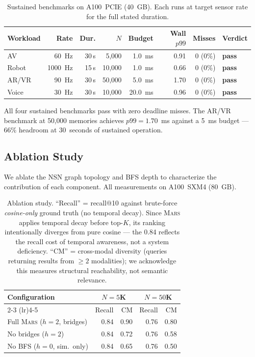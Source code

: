 \documentclass[11pt]{article}
\newcommand{\mars}{\textsc{Mars}}
\begin{document}
\begin{table}[ht]
\centering
\small
\caption{Sustained benchmarks on A100~PCIE (40~GB). Each runs at target
sensor rate for the full stated duration.}
\label{tab:sustained}
\begin{tabular}{lrrrrrrl}
\toprule
\textbf{Workload} & \textbf{Rate} & \textbf{Dur.} & \textbf{$N$} & \textbf{Budget} & \textbf{Wall $p99$} & \textbf{Misses} & \textbf{Verdict} \\
\midrule
AV        &   60~Hz & 30\,s &  5{,}000 &  1.0~ms & 0.91 &   0 (0\%) & \textbf{pass} \\
Robot     & 1000~Hz & 15\,s & 10{,}000 &  1.0~ms & 0.66 &   0 (0\%) & \textbf{pass} \\
AR/VR     &   90~Hz & 30\,s & 50{,}000 &  5.0~ms & 1.70 &   0 (0\%) & \textbf{pass} \\
Voice     &   30~Hz & 30\,s & 10{,}000 & 20.0~ms & 0.96 &   0 (0\%) & \textbf{pass} \\
\bottomrule
\end{tabular}
\end{table}

All four sustained benchmarks pass with zero deadline misses. The AR/VR
benchmark at 50{,}000 memories achieves $p99 = 1.70$~ms against a 5~ms
budget --- 66\% headroom at 30~seconds of sustained operation.

\subsection{Ablation Study}
\label{sec:ablation}

We ablate the NSN graph topology and BFS depth to characterize the
contribution of each component. All measurements on A100~SXM4 (80~GB).

\begin{table}[ht]
\centering
\small
\caption{Ablation study. ``Recall'' = recall@10 against brute-force
\emph{cosine-only} ground truth (no temporal decay). Since \mars{}
applies temporal decay before top-$K$, its ranking intentionally
diverges from pure cosine --- the 0.84 reflects the recall cost of
temporal awareness, not a system deficiency. ``CM'' = cross-modal
diversity (queries returning results from $\geq 2$ modalities);
we acknowledge this measures structural reachability, not semantic
relevance.}
\label{tab:ablation}
\begin{tabular}{lrrrr}
\toprule
\textbf{Configuration} & \multicolumn{2}{c}{\textbf{$N{=}5$K}} & \multicolumn{2}{c}{\textbf{$N{=}50$K}} \\
\cmidrule(lr){2-3} \cmidrule(lr){4-5}
 & Recall & CM & Recall & CM \\
\midrule
Full \mars{} ($h{=}2$, bridges) & 0.84 & 0.90 & 0.76 & 0.80 \\
No bridges ($h{=}2$)            & 0.84 & 0.72 & 0.76 & 0.58 \\
No BFS ($h{=}0$, sim.\ only)    & 0.84 & 0.65 & 0.76 & 0.50 \\
\bottomrule
\end{tabular}
\end{table}
\end{document}
